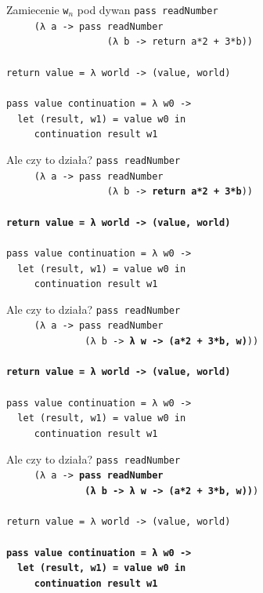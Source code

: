 \documentclass{beamer}
\begin{document}
\begin{frame}{Zamiecenie \texttt{w$_n$} pod dywan}
  \texttt{pass readNumber \\
    \ \ \ \ \ (λ a \pause -> pass readNumber \\
    \ \ \ \ \ \ \ \ \ \ \ \ \ \ \ \ \ \ (λ b \pause -> return a*2 + 3*b)) \\
    \ \\ \pause
    return value = λ world -> (value, world) \\ \pause
    \ \\
    pass value continuation = λ w0 -> \\
    \ \ let (result, w1) = value w0 in \\
    \ \ \ \ \ continuation result w1
  }
\end{frame}


\begin{frame}{Ale czy to działa?}
  \texttt{pass readNumber\\
    \ \ \ \ \ (λ a -> pass readNumber\\
    \ \ \ \ \ \ \ \ \ \ \ \ \ \ \ \ \ \ (λ b -> \textbf{return a*2 + 3*b}))\\
    \ \\
    \textbf{return value = λ world -> (value, world)} \\
    \ \\
    pass value continuation = λ w0 -> \\
    \ \ let (result, w1) = value w0 in \\
    \ \ \ \ \ continuation result w1
  }
\end{frame}

\begin{frame}{Ale czy to działa?}
  \texttt{pass readNumber\\
    \ \ \ \ \ (λ a -> pass readNumber\\
    \ \ \ \ \ \ \ \ \ \ \ \ \ \ (λ b -> \textbf{λ w -> (a*2 + 3*b, w)}))\\
    \ \\
    \textbf{return value = λ world -> (value, world)} \\
    \ \\
    pass value continuation = λ w0 -> \\
    \ \ let (result, w1) = value w0 in \\
    \ \ \ \ \ continuation result w1
  }
\end{frame}

\begin{frame}{Ale czy to działa?}
  \texttt{pass readNumber\\
    \ \ \ \ \ (λ a -> \textbf{pass readNumber\\
      \ \ \ \ \ \ \ \ \ \ \ \ \ \ (λ b -> λ w -> (a*2 + 3*b, w))})\\
    \ \\
    return value = λ world -> (value, world) \\
    \ \\
    \textbf{pass value continuation = λ w0 -> \\
      \ \ let (result, w1) = value w0 in \\
      \ \ \ \ \ continuation result w1}
  }
\end{frame}
\end{document}
